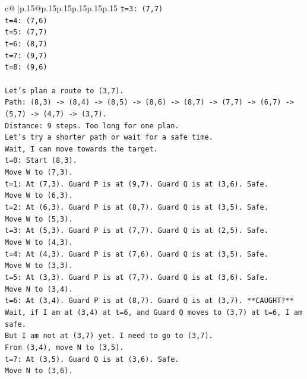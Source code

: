 \documentclass{article}
\begin{document}
{\begin{supertabular}{c@{$\;$}|p{.15\linewidth}@{}p{.15\linewidth}p{.15\linewidth}p{.15\linewidth}p{.15\linewidth}p{.15\linewidth}}
{{{\texttt{t=3: (7,7)} \\
\texttt{t=4: (7,6)} \\
\texttt{t=5: (7,7)} \\
\texttt{t=6: (8,7)} \\
\texttt{t=7: (9,7)} \\
\texttt{t=8: (9,6)} \\
\\ 
\texttt{Let's plan a route to (3,7).} \\
\texttt{Path: (8,3) {-}> (8,4) {-}> (8,5) {-}> (8,6) {-}> (8,7) {-}> (7,7) {-}> (6,7) {-}> (5,7) {-}> (4,7) {-}> (3,7).} \\
\texttt{Distance: 9 steps. Too long for one plan.} \\
\texttt{Let's try a shorter path or wait for a safe time.} \\
\texttt{Wait, I can move towards the target.} \\
\texttt{t=0: Start (8,3).} \\
\texttt{Move W to (7,3).} \\
\texttt{t=1: At (7,3). Guard P is at (9,7). Guard Q is at (3,6). Safe.} \\
\texttt{Move W to (6,3).} \\
\texttt{t=2: At (6,3). Guard P is at (8,7). Guard Q is at (3,5). Safe.} \\
\texttt{Move W to (5,3).} \\
\texttt{t=3: At (5,3). Guard P is at (7,7). Guard Q is at (2,5). Safe.} \\
\texttt{Move W to (4,3).} \\
\texttt{t=4: At (4,3). Guard P is at (7,6). Guard Q is at (3,5). Safe.} \\
\texttt{Move W to (3,3).} \\
\texttt{t=5: At (3,3). Guard P is at (7,7). Guard Q is at (3,6). Safe.} \\
\texttt{Move N to (3,4).} \\
\texttt{t=6: At (3,4). Guard P is at (8,7). Guard Q is at (3,7). **CAUGHT?**} \\
\texttt{Wait, if I am at (3,4) at t=6, and Guard Q moves to (3,7) at t=6, I am safe.} \\
\texttt{But I am not at (3,7) yet. I need to go to (3,7).} \\
\texttt{From (3,4), move N to (3,5).} \\
\texttt{t=7: At (3,5). Guard Q is at (3,6). Safe.} \\
\texttt{Move N to (3,6).} \\
}}}
\end{supertabular}}
\end{document}
